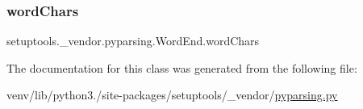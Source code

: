\mbox{\label{classsetuptools_1_1__vendor_1_1pyparsing_1_1WordEnd_a9a7a435976cb1e5ebc244c13680a1683}} 
\subsubsection{\texorpdfstring{word\+Chars}{wordChars}}
{\footnotesize\ttfamily setuptools.\+\_\+vendor.\+pyparsing.\+Word\+End.\+word\+Chars}



The documentation for this class was generated from the following file\+:\begin{DoxyCompactItemize}
\item 
venv/lib/python3./site-\/packages/setuptools/\+\_\+vendor/\hyperlink{setuptools_2__vendor_2pyparsing_8py}{pyparsing.\+py}\end{DoxyCompactItemize}
